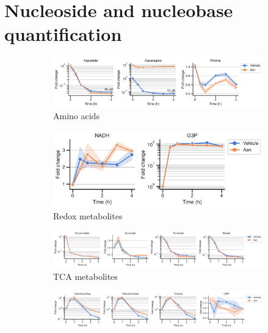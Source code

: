 \chapter{Nucleoside and nucleobase quantification}



\begin{figure}[!ht]
     \centering
     \begin{subfigure}[b]{0.68\textwidth}
         \includegraphics[width=\textwidth]{figures/chap2/app/HT1080_Anti_AA.pdf}
         \caption{Amino acids}
         \label{fig:app_ch2:HT1080_Anti_AA}
     \end{subfigure}
     \hfill
     \begin{subfigure}[b]{0.45\textwidth}
         \includegraphics[width=\textwidth]{figures/chap2/app/HT1080_Anti_rd.pdf}
         \caption{Redox metabolites}
         \label{fig:app_ch2:HT1080_Anti_rd}
     \end{subfigure}
     \hfill
     \begin{subfigure}[b]{0.9\textwidth}
         \includegraphics[width=\textwidth]{figures/chap2/app/HT1080_Anti_tca.pdf}
         \caption{TCA metabolites}
         \label{fig:app_ch2:HT1080_Anti_tca}
     \end{subfigure}
     \hfill
     \begin{subfigure}[b]{0.9\textwidth}
         \includegraphics[width=\textwidth]{figures/chap2/app/HT1080_Anti_pyr.pdf}

\end{subfigure}
\end{figure}
